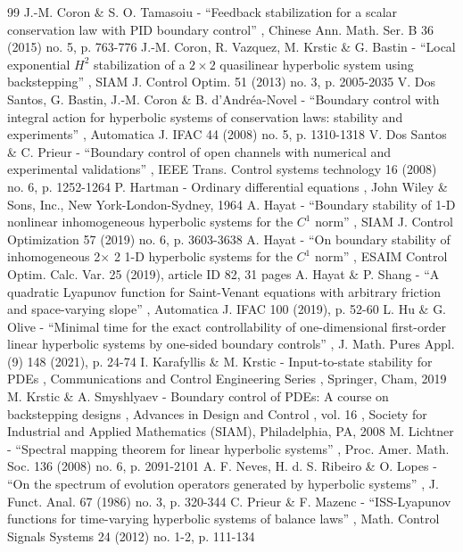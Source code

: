 \documentclass[11pt]{article}
\numberwithin{equation}{section}
\theoremstyle{definition}
\begin{document}
\begin{thebibliography}{99}
 J.-M. Coron \& S. O. Tamasoiu - “Feedback stabilization for a scalar conservation law with PID boundary control” , Chinese Ann. Math. Ser. B 36 (2015) no. 5, p. 763-776
 J.-M. Coron, R. Vazquez, M. Krstic \& G. Bastin - “Local exponential $H^2$ stabilization of a $2\times 2$ quasilinear hyperbolic system using backstepping” , SIAM J. Control Optim. 51 (2013) no. 3, p. 2005-2035
 V. Dos Santos, G. Bastin, J.-M. Coron \& B. d’Andréa-Novel - “Boundary control with integral action for hyperbolic systems of conservation laws: stability and experiments” , Automatica J. IFAC 44 (2008) no. 5, p. 1310-1318
 V. Dos Santos \& C. Prieur - “Boundary control of open channels with numerical and experimental validations” , IEEE Trans. Control systems technology 16 (2008) no. 6, p. 1252-1264
 P. Hartman - Ordinary differential equations , John Wiley \& Sons, Inc., New York-London-Sydney, 1964
 A. Hayat - “Boundary stability of 1-D nonlinear inhomogeneous hyperbolic systems for the $C^{1}$ norm” , SIAM J. Control Optimization 57 (2019) no. 6, p. 3603-3638
 A. Hayat - “On boundary stability of inhomogeneous 2$\times $ 2 1-D hyperbolic systems for the $C^{1}$ norm” , ESAIM Control Optim. Calc. Var. 25 (2019), article ID 82, 31 pages
 A. Hayat \& P. Shang - “A quadratic Lyapunov function for Saint-Venant equations with arbitrary friction and space-varying slope” , Automatica J. IFAC 100 (2019), p. 52-60
 L. Hu \& G. Olive - “Minimal time for the exact controllability of one-dimensional first-order linear hyperbolic systems by one-sided boundary controls” , J. Math. Pures Appl. (9) 148 (2021), p. 24-74
 I. Karafyllis \& M. Krstic - Input-to-state stability for PDEs , Communications and Control Engineering Series , Springer, Cham, 2019
 M. Krstic \& A. Smyshlyaev - Boundary control of PDEs: A course on backstepping designs , Advances in Design and Control , vol. 16 , Society for Industrial and Applied Mathematics (SIAM), Philadelphia, PA, 2008
 M. Lichtner - “Spectral mapping theorem for linear hyperbolic systems” , Proc. Amer. Math. Soc. 136 (2008) no. 6, p. 2091-2101
 A. F. Neves, H. d. S. Ribeiro \& O. Lopes - “On the spectrum of evolution operators generated by hyperbolic systems” , J. Funct. Anal. 67 (1986) no. 3, p. 320-344
 C. Prieur \& F. Mazenc - “ISS-Lyapunov functions for time-varying hyperbolic systems of balance laws” , Math. Control Signals Systems 24 (2012) no. 1-2, p. 111-134

\end{thebibliography}
\end{document}
